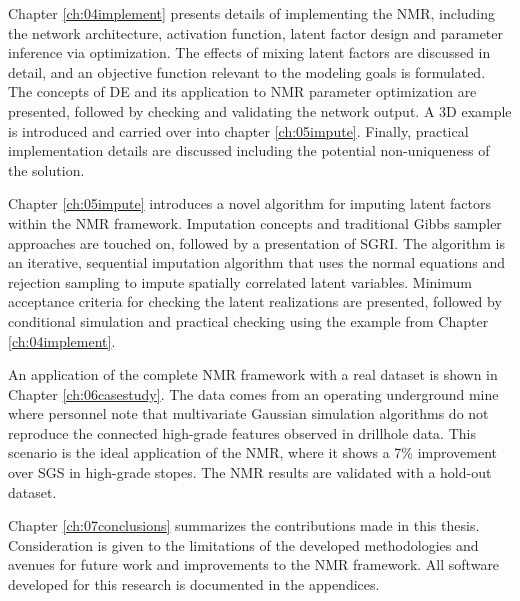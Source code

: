Chapter \ref{ch:04implement} presents details of implementing the \gls{NMR}, including the network architecture, activation function, latent factor design and parameter inference via optimization. The effects of mixing latent factors are discussed in detail, and an objective function relevant to the modeling goals is formulated. The concepts of \acrfull{DE} and its application to \gls{NMR} parameter optimization are presented, followed by checking and validating the network output. A \gls{3D} example is introduced and carried over into chapter \ref{ch:05impute}. Finally, practical implementation details are discussed including the potential non-uniqueness of the solution.

Chapter \ref{ch:05impute} introduces a novel algorithm for imputing latent factors within the \gls{NMR} framework. Imputation concepts and traditional Gibbs sampler approaches are touched on, followed by a presentation of \acrfull{SGRI}. The algorithm is an iterative, sequential imputation algorithm that uses the normal equations and rejection sampling to impute spatially correlated latent variables. Minimum acceptance criteria for checking the latent realizations are presented, followed by conditional simulation and practical checking using the example from Chapter \ref{ch:04implement}.

An application of the complete \gls{NMR} framework with a real dataset is shown in Chapter \ref{ch:06casestudy}. The data comes from an operating underground mine where personnel note that multivariate Gaussian simulation algorithms do not reproduce the connected high-grade features observed in drillhole data. This scenario is the ideal application of the \gls{NMR}, where it shows a 7\% improvement over \gls{SGS} in high-grade stopes. The \gls{NMR} results are validated with a hold-out dataset.

Chapter \ref{ch:07conclusions} summarizes the contributions made in this thesis. Consideration is given to the limitations of the developed methodologies and avenues for future work and improvements to the \gls{NMR} framework. All software developed for this research is documented in the appendices.